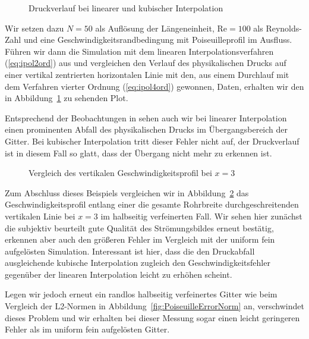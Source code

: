 \begin{figure}[h]
\begin{adjustbox}{center}

\end{adjustbox}
\caption{Druckverlauf bei linearer und kubischer Interpolation \cite[vgl.~Abb.~11]{Lagrava12}}
\label{fig:PoiseuilleMassloss}
\end{figure}

Wir setzen dazu \(N=50\) als Auflösung der Längeneinheit, \(\text{Re}=100\) als Reynolds-Zahl und eine Geschwindigkeitsrandbedingung mit Poiseuilleprofil im Ausfluss. Führen wir dann die Simulation mit dem linearen Interpolationsverfahren (\ref{eq:ipol2ord}) aus und vergleichen den Verlauf des physikalischen Drucks auf einer vertikal zentrierten horizontalen Linie mit den, aus einem Durchlauf mit dem Verfahren vierter Ordnung (\ref{eq:ipol4ord}) gewonnen, Daten, erhalten wir den in Abbildung~\ref{fig:PoiseuilleMassloss} zu sehenden Plot.

Entsprechend der Beobachtungen in \cite[Kap.~3.7]{Lagrava12} sehen auch wir bei linearer Interpolation einen prominenten Abfall des physikalischen Drucks im Übergangsbereich der Gitter. Bei kubischer Interpolation tritt dieser Fehler nicht auf, der Druckverlauf ist in diesem Fall so glatt, dass der Übergang nicht mehr zu erkennen ist.

\begin{figure}[h]
\begin{adjustbox}{center}

\end{adjustbox}
\caption{Vergleich des vertikalen Geschwindigkeitsprofil bei \(x=3\)}
\label{fig:PoiseuilleOutflowProfile}
\end{figure}

Zum Abschluss dieses Beispiels vergleichen wir in Abbildung~\ref{fig:PoiseuilleOutflowProfile} das Geschwindigkeitsprofil entlang einer die gesamte Rohrbreite durchgeschreitenden vertikalen Linie bei \(x=3\) im halbseitig verfeinerten Fall. Wir sehen hier zunächst die subjektiv beurteilt gute Qualität des Strömungsbildes erneut bestätig, erkennen aber auch den größeren Fehler im Vergleich mit der uniform fein aufgelösten Simulation. Interessant ist hier, dass die den Druckabfall ausgleichende kubische Interpolation zugleich den Geschwindigkeitsfehler gegenüber der linearen Interpolation leicht zu erhöhen scheint.

Legen wir jedoch erneut ein randlos halbseitig verfeinertes Gitter wie beim Vergleich der L2-Normen in Abbildung~\ref{fig:PoiseuilleErrorNorm} an, verschwindet dieses Problem und wir erhalten bei dieser Messung sogar einen leicht geringeren Fehler als im uniform fein aufgelösten Gitter.

